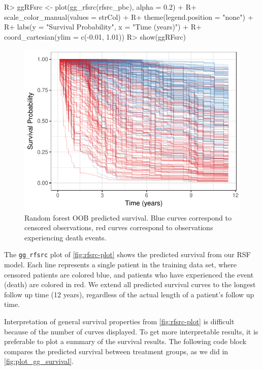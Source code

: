 \documentclass[article, nojss]{jss}
\begin{document}
\begin{Schunk}
\begin{Sinput}
R> ggRFsrc <- plot(gg_rfsrc(rfsrc_pbc), alpha = 0.2) +
R+   scale_color_manual(values = strCol) +
R+   theme(legend.position = "none") +
R+   labs(y = "Survival Probability", x = "Time (years)") +
R+   coord_cartesian(ylim = c(-0.01, 1.01))
R> show(ggRFsrc)
\end{Sinput}
\begin{figure}[!htb]

{\centering \includegraphics{rfs-rfsrc-plot-1}

}

\caption[Random forest OOB predicted survival]{Random forest OOB predicted survival. Blue curves correspond to censored observations, red curves correspond to observations experiencing death events.}\label{fig:rfsrc-plot}
\end{figure}
\end{Schunk}

The \texttt{gg\_rfsrc} plot of \autoref{fig:rfsrc-plot} shows the
predicted survival from our RSF model. Each line represents a single
patient in the training data set, where censored patients are colored
blue, and patients who have experienced the event (death) are colored in
red. We extend all predicted survival curves to the longest follow up
time (12 years), regardless of the actual length of a patient's follow
up time.

Interpretation of general survival properties from
\autoref{fig:rfsrc-plot} is difficult because of the number of curves
displayed. To get more interpretable results, it is preferable to plot a
summary of the survival results. The following code block compares the
predicted survival between treatment groups, as we did in
\autoref{fig:plot_gg_survival}.
\end{document}
